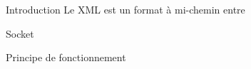 \begin{frame}{Introduction}
  Le XML est un format à mi-chemin entre 
\end{frame}

\begin{frame}{}
  Socket
  
\end{frame}

\begin{frame}{Principe de fonctionnement}
  
\end{frame}